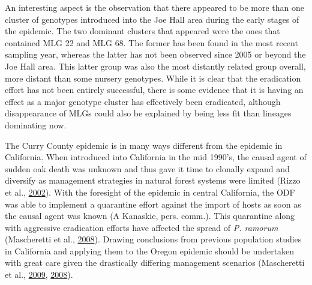 \documentclass[double,12pt]{beavtex}
\begin{document}
  An interesting aspect is the observation that there appeared to be more
  than one cluster of genotypes introduced into the Joe Hall area during
  the early stages of the epidemic. The two dominant clusters that
  appeared were the ones that contained MLG 22 and MLG 68. The former has
  been found in the most recent sampling year, whereas the latter has not
  been observed since 2005 or beyond the Joe Hall area. This latter group
  was also the most distantly related group overall, more distant than
  some nursery genotypes. While it is clear that the eradication effort
  has not been entirely successful, there is some evidence that it is
  having an effect as a major genotype cluster has effectively been
  eradicated, although disappearance of MLGs could also be explained by
  being less fit than lineages dominating now.
  
  The Curry County epidemic is in many ways different from the epidemic in
  California. When introduced into California in the mid 1990's, the
  causal agent of sudden oak death was unknown and thus gave it time to
  clonally expand and diversify as management strategies in natural forest
  systems were limited (Rizzo et al.,
  \protect\hyperlink{ref-rizzo2002phytophthora}{2002}). With the foresight
  of the epidemic in central California, the ODF was able to implement a
  quarantine effort against the import of hosts as soon as the causal
  agent was known (A Kanaskie, pers. comm.). This quarantine along with
  aggressive eradication efforts have affected the spread of \emph{P.
  ramorum} (Mascheretti et al.,
  \protect\hyperlink{ref-mascheretti2008reconstruction}{2008}). Drawing
  conclusions from previous population studies in California and applying
  them to the Oregon epidemic should be undertaken with great care given
  the drastically differing management scenarios (Mascheretti et al.,
  \protect\hyperlink{ref-mascheretti2009genetic}{2009},
  \protect\hyperlink{ref-mascheretti2008reconstruction}{2008}).
  
\end{document}
